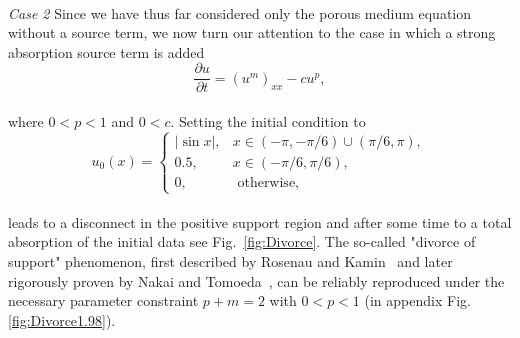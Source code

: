 \documentclass[a4paper,12pt]{paper}
\begin{document}
\\
\textit{Case 2} Since we have thus far considered only the porous medium equation without a source term, we now turn our attention to the case in which a strong absorption source term is added\\
\begin{equation}
	\frac{\partial u}{\partial t} = \left(u^m\right)_{x x} - c u^p,
\end{equation}\\
where $0<p<1$ and $0<c$. Setting the initial condition to\\
\begin{equation}
	u_0(x)= \begin{cases}|\sin x|, & x \in(-\pi,-\pi / 6) \cup(\pi / 6, \pi), \\ 0.5, & x \in(-\pi / 6, \pi / 6), \\ 0, & \text { otherwise, }
	\end{cases}
	\label{eq:divorce}
\end{equation}\\
leads to a disconnect in the positive support region and after some time to a total absorption of the initial data see Fig.~\ref{fig:Divorce}. The so-called "divorce of support" phenomenon, first described by Rosenau and Kamin~\cite{ROSENAU1983273} and later rigorously proven by Nakai and Tomoeda~\cite{Nakaki}, can be reliably reproduced under the necessary parameter constraint \( p + m = 2 \) with \( 0 < p < 1 \) (in appendix Fig.\ref{fig:Divorce1.98}).\\
\end{document}
